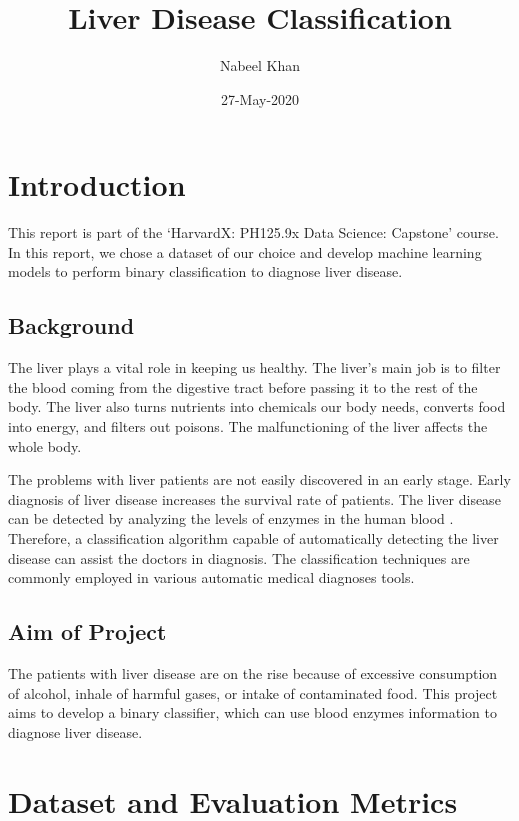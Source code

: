 \documentclass[]{article}
\title{Liver Disease Classification}
\author{Nabeel Khan}
\date{27-May-2020}
\begin{document}
\maketitle

{
\setcounter{tocdepth}{2}
\tableofcontents
}
\section{Introduction}
\label{sec:introduction}

This report is part of the `HarvardX: PH125.9x Data Science: Capstone'
course. In this report, we chose a dataset of our choice and develop
machine learning models to perform binary classification to diagnose
liver disease.

\subsection{Background}
\label{sec:background}

The liver plays a vital role in keeping us healthy. The liver's main job
is to filter the blood coming from the digestive tract before passing it
to the rest of the body. The liver also turns nutrients into chemicals
our body needs, converts food into energy, and filters out poisons. The
malfunctioning of the liver affects the whole body.

The problems with liver patients are not easily discovered in an early
stage. Early diagnosis of liver disease increases the survival rate of
patients. The liver disease can be detected by analyzing the levels of
enzymes in the human blood \cite{ld,bendi}. Therefore, a classification
algorithm capable of automatically detecting the liver disease can
assist the doctors in diagnosis. The classification techniques are
commonly employed in various automatic medical diagnoses
tools\cite{cad}.

\subsection{Aim of Project}
\label{sec:aim}

The patients with liver disease are on the rise because of excessive
consumption of alcohol, inhale of harmful gases, or intake of
contaminated food. This project aims to develop a binary classifier,
which can use blood enzymes information to diagnose liver disease.

\section{Dataset and Evaluation Metrics}
\label{sec:dataset}
\end{document}
